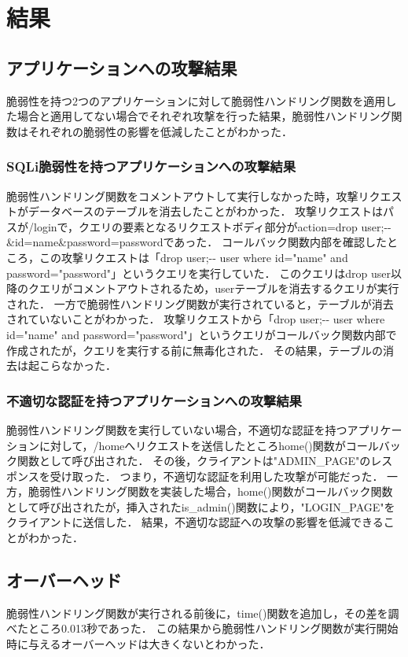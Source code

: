 \documentclass[a4paper,12pt]{jreport}
\begin{document}
\chapter{結果}
\section{アプリケーションへの攻撃結果}
脆弱性を持つ2つのアプリケーションに対して脆弱性ハンドリング関数を適用した場合と適用してない場合でそれぞれ攻撃を行った結果，脆弱性ハンドリング関数はそれぞれの脆弱性の影響を低減したことがわかった．

\subsection{SQLi脆弱性を持つアプリケーションへの攻撃結果}
脆弱性ハンドリング関数をコメントアウトして実行しなかった時，攻撃リクエストがデータベースのテーブルを消去したことがわかった．
攻撃リクエストはパスが/loginで，クエリの要素となるリクエストボディ部分がaction=drop user;-\--\&id=name\&password=passwordであった．
コールバック関数内部を確認したところ，この攻撃リクエストは「drop user;-\-- user where id="name" and password="password"」というクエリを実行していた．
このクエリはdrop user以降のクエリがコメントアウトされるため，userテーブルを消去するクエリが実行された．
一方で脆弱性ハンドリング関数が実行されていると，テーブルが消去されていないことがわかった．
攻撃リクエストから「drop user;-\-- user where id="name" and password="password"」というクエリがコールバック関数内部で作成されたが，クエリを実行する前に無毒化された．
その結果，テーブルの消去は起こらなかった．

\subsection{不適切な認証を持つアプリケーションへの攻撃結果}
脆弱性ハンドリング関数を実行していない場合，不適切な認証を持つアプリケーションに対して，/homeへリクエストを送信したところhome()関数がコールバック関数として呼び出された．
その後，クライアントは"ADMIN\_PAGE"のレスポンスを受け取った．
つまり，不適切な認証を利用した攻撃が可能だった．
一方，脆弱性ハンドリング関数を実装した場合，home()関数がコールバック関数として呼び出されたが，挿入されたis\_admin()関数により，"LOGIN\_PAGE"をクライアントに送信した．
結果，不適切な認証への攻撃の影響を低減できることがわかった．

\section{オーバーヘッド}
脆弱性ハンドリング関数が実行される前後に，time()関数を追加し，その差を調べたところ0.013秒であった．
この結果から脆弱性ハンドリング関数が実行開始時に与えるオーバーヘッドは大きくないとわかった．
\end{document}
